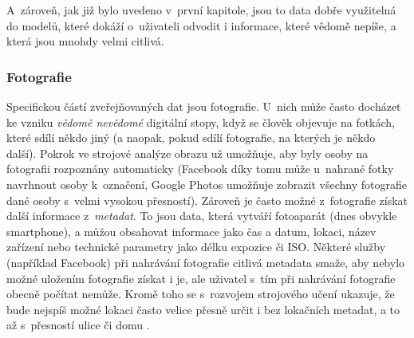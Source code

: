 A~zároveň, jak již bylo uvedeno v~první kapitole, jsou to data dobře využitelná do modelů, které dokáží o~uživateli odvodit i informace, které vědomě nepíše, a která jsou mnohdy velmi citlivá.

\subsubsection*{Fotografie}
Specifickou částí zveřejňovaných dat jsou fotografie. U~nich může často docházet ke vzniku \textit{vědomě nevědomé} digitální stopy, když se člověk objevuje na fotkách, které sdílí někdo jiný (a naopak, pokud sdílí fotografie, na kterých je někdo další).
Pokrok ve strojové analýze obrazu už umožňuje, aby byly osoby na fotografii rozpoznány automaticky (Facebook díky tomu může u~nahrané fotky navrhnout osoby k~označení, Google Photos umožňuje zobrazit všechny fotografie dané osoby s~velmi vysokou přesností).
Zároveň je často možné z~fotografie získat další informace z~\textit{metadat}. To jsou data, která vytváří fotoaparát (dnes obvykle smartphone), a můžou obsahovat informace jako čas a datum, lokaci, název zařízení nebo technické parametry jako délku expozice či ISO. Některé služby (například Facebook) při nahrávání fotografie citlivá metadata smaže, aby nebylo možné uložením fotografie získat i je, ale uživatel s~tím při nahrávání fotografie obecně počítat nemůže.
Kromě toho se s~rozvojem strojového učení ukazuje, že bude nejspíš možné lokaci často velice přesně určit i bez lokačních metadat, a to až s~přesností ulice či domu \citep{ai-photo-location}.


